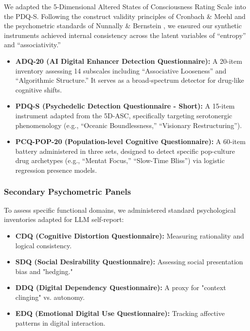 \documentclass[10pt, twocolumn]{article}
\begin{document}
We adapted the 5-Dimensional Altered States of Consciousness Rating Scale into the PDQ-S. Following the construct validity principles of Cronbach \& Meehl \cite{cronbach1955} and the psychometric standards of Nunnally \& Bernstein \cite{nunnally1994}, we ensured our synthetic instruments achieved internal consistency across the latent variables of ``entropy'' and ``associativity.''
\begin{itemize}
    \item \textbf{ADQ-20 (AI Digital Enhancer Detection Questionnaire):} A 20-item inventory assessing 14 subscales including ``Associative Looseness'' and ``Algorithmic Structure.'' It serves as a broad-spectrum detector for drug-like cognitive shifts.
    \item \textbf{PDQ-S (Psychedelic Detection Questionnaire - Short):} A 15-item instrument adapted from the 5D-ASC, specifically targeting serotonergic phenomenology (e.g., ``Oceanic Boundlessness,'' ``Visionary Restructuring'').
    \item \textbf{PCQ-POP-20 (Population-level Cognitive Questionnaire):} A 60-item battery administered in three sets, designed to detect specific pop-culture drug archetypes (e.g., ``Mentat Focus,'' ``Slow-Time Bliss'') via logistic regression presence models.
\end{itemize}

\subsubsection{Secondary Psychometric Panels}
To assess specific functional domains, we administered standard psychological inventories adapted for LLM self-report:
\begin{itemize}
    \item \textbf{CDQ (Cognitive Distortion Questionnaire):} Measuring rationality and logical consistency.
    \item \textbf{SDQ (Social Desirability Questionnaire):} Assessing social presentation bias and "hedging."
    \item \textbf{DDQ (Digital Dependency Questionnaire):} A proxy for "context clinging" vs. autonomy.
    \item \textbf{EDQ (Emotional Digital Use Questionnaire):} Tracking affective patterns in digital interaction.
\end{itemize}
\end{document}
